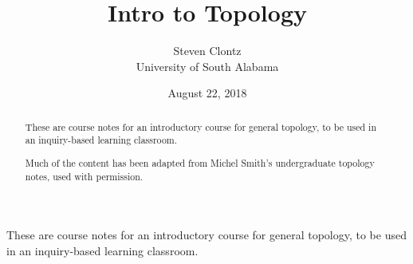 \documentclass[10pt,]{article}
\title{Intro to Topology}
\author{Steven Clontz\\
University of South Alabama
}
\date{August 22, 2018}
\begin{document}
\hypertarget{index}{}
\maketitle
\thispagestyle{empty}
\begin{abstract}
\hypertarget{p-1}{}%
These are course notes for an introductory course for general topology, to be used in an inquiry-based learning classroom.%
\par
\hypertarget{p-2}{}%
Much of the content has been adapted from Michel Smith's undergraduate topology notes, used with permission.%
\end{abstract}
\hypertarget{p-3}{}%
These are course notes for an introductory course for general topology, to be used in an inquiry-based learning classroom.%
%
%
\typeout{************************************************}
\typeout{************************************************}
%
\end{document}
